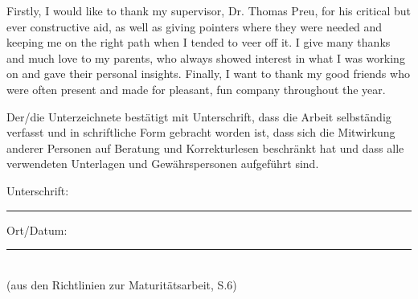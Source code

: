 \documentclass[
11pt, %
english, %
singlespacing, %
headsepline, %
]{Thesis} %
\begin{document}
\begin{acknowledgements}
	\addchaptertocentry{\acknowledgementname} %
	Firstly, I would like to thank my supervisor, Dr. Thomas Preu, for his critical but ever constructive aid, as well as giving pointers where they were needed and keeping me on the right path when I tended to veer off it. I give many thanks and much love to my parents, who always showed interest in what I was working on and gave their personal insights. Finally, I want to thank my good friends who were often present and made for pleasant, fun company throughout the year.
	\end{acknowledgements}
	


\tableofcontents %




\mainmatter %

\pagestyle{thesis} %






\printbibliography[title=Sources]

\listoffigures %

\listoftables %


\begin{declaration}
	\addchaptertocentry{\authorshipname} %
	\noindent Der/die Unterzeichnete bestätigt mit Unterschrift, dass die Arbeit selbständig verfasst und in schriftliche Form gebracht worden ist, dass sich die Mitwirkung anderer Personen auf Beratung und Korrekturlesen beschränkt hat und dass alle verwendeten Unterlagen und Gewährspersonen aufgeführt sind.
	\vspace{1.5cm}
	
	\noindent Unterschrift:\\
	\rule[0.5em]{25em}{0.5pt} %
	
	\noindent Ort/Datum:\\
	\rule[0.5em]{25em}{0.5pt}\\ %
	(aus den Richtlinien zur Maturitätsarbeit, S.6)
	\end{declaration}
\end{document}
